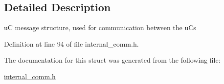 \subsection{Detailed Description}
uC message structure, used for communication between the uCs 

Definition at line 94 of file internal\_\-comm.h.

The documentation for this struct was generated from the following file:\begin{CompactItemize}
\item 
\hyperlink{internal__comm_8h}{internal\_\-comm.h}\end{CompactItemize}
